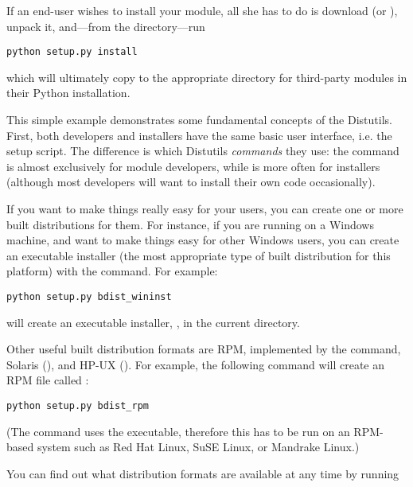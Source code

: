 \documentclass{manual}
\begin{document}
If an end-user wishes to install your  module, all she has
to do is download  (or ), unpack it,
and---from the  directory---run

\begin{verbatim}
python setup.py install
\end{verbatim}

which will ultimately copy  to the appropriate directory
for third-party modules in their Python installation.

This simple example demonstrates some fundamental concepts of the
Distutils. First, both developers and installers have the same basic
user interface, i.e. the setup script.  The difference is which
Distutils \emph{commands} they use: the  command is
almost exclusively for module developers, while  is
more often for installers (although most developers will want to install
their own code occasionally).

If you want to make things really easy for your users, you can create
one or more built distributions for them.  For instance, if you are
running on a Windows machine, and want to make things easy for other
Windows users, you can create an executable installer (the most
appropriate type of built distribution for this platform) with the
 command.  For example:

\begin{verbatim}
python setup.py bdist_wininst
\end{verbatim}

will create an executable installer, , in the
current directory.

Other useful built distribution formats are RPM, implemented by the
 command, Solaris 
(), and HP-UX 
().  For example, the following command will
create an RPM file called :

\begin{verbatim}
python setup.py bdist_rpm
\end{verbatim}

(The  command uses the  executable,
therefore this has to be run on an RPM-based system such as Red Hat
Linux, SuSE Linux, or Mandrake Linux.)

You can find out what distribution formats are available at any time by
running
\end{document}
